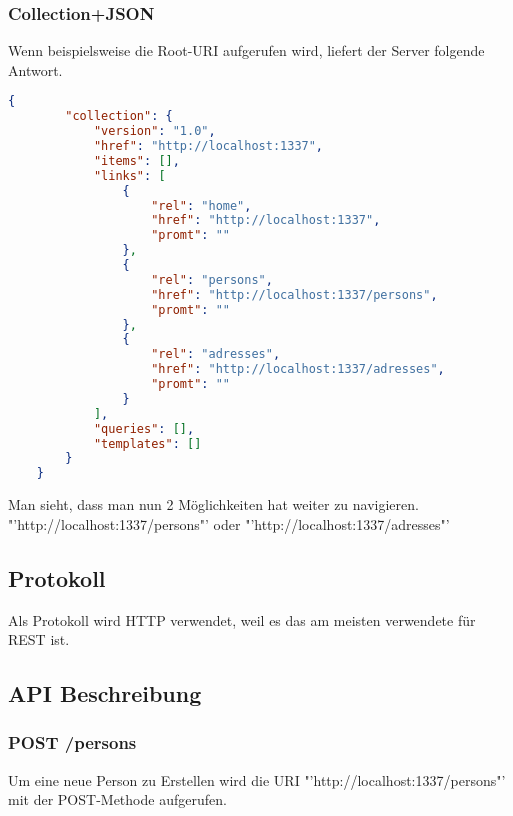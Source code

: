 \documentclass[listof=totoc]{article}
\begin{document}
	\newpage
	\subsubsection{Collection+\ac{JSON}}
	Wenn beispielsweise die Root-\ac{URI} aufgerufen wird, liefert der Server folgende Antwort. 
	\begin{lstlisting}[language=json,caption=Collection+\ac{JSON}-Repräsentation (application/vnd.collection+json)]
	{
		"collection": {
			"version": "1.0",
			"href": "http://localhost:1337",
			"items": [],
			"links": [
				{
					"rel": "home",
					"href": "http://localhost:1337",
					"promt": ""
				},
				{
					"rel": "persons",
					"href": "http://localhost:1337/persons",
					"promt": ""
				},
				{
					"rel": "adresses",
					"href": "http://localhost:1337/adresses",
					"promt": ""
				}
			],
			"queries": [],
			"templates": []
		}
	}
	\end{lstlisting}
	Man sieht, dass man nun 2 Möglichkeiten hat weiter zu navigieren.
	\newline
	"'http://localhost:1337/persons"' oder "'http://localhost:1337/adresses"'
	
	\subsection{Protokoll}
	Als Protokoll wird \ac{HTTP} verwendet, weil es das am meisten verwendete für \ac{REST} ist.
	\newpage
	
	\lstset{numbers=none}	%
	\subsection{\ac{API} Beschreibung}
	\subsubsection{POST /persons}
	Um eine neue Person zu Erstellen wird die \ac{URI} "'http://localhost:1337/persons"' mit der POST-Methode aufgerufen.
	\newline
	
\end{document}
